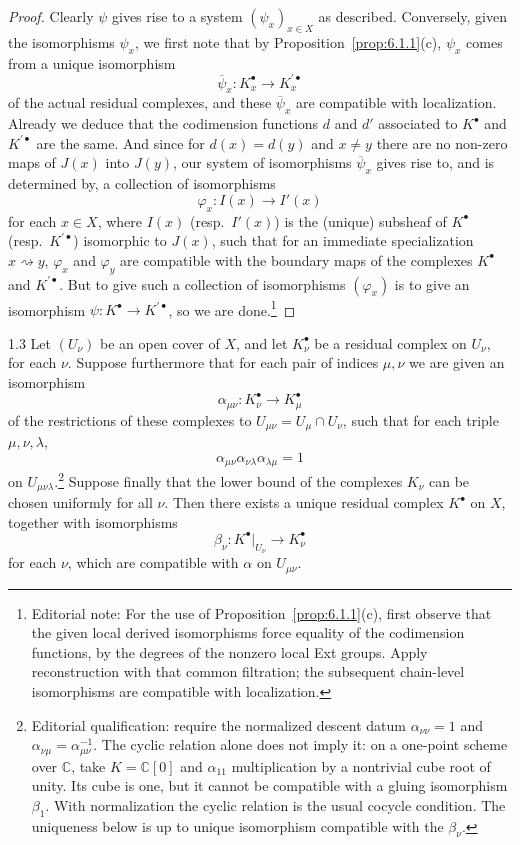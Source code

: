 \begin{proof}
Clearly $\psi$ gives rise to a system $(\psi_x)_{x\in X}$ as described. Conversely, given the isomorphisms $\psi_x$, we first note that by Proposition~\ref{prop:6.1.1}(c), $\psi_x$ comes from a unique isomorphism
\[
\overline{\psi}_x\colon K_x^\bullet\longrightarrow K_x^{\prime\bullet}
\]
of the actual residual complexes, and these $\overline{\psi}_x$ are compatible with localization. Already we deduce that the codimension functions $d$ and $d'$ associated to $K^\bullet$ and $K^{\prime\bullet}$ are the same. And since for $d(x)=d(y)$ and $x\neq y$ there are no non-zero maps of $J(x)$ into $J(y)$, our system of isomorphisms $\overline{\psi}_x$ gives rise to, and is determined by, a collection of isomorphisms
\[
\varphi_x\colon I(x)\longrightarrow I'(x)
\]
for each $x\in X$, where $I(x)$ (resp.\ $I'(x)$) is the (unique) subsheaf of $K^\bullet$ (resp.\ $K^{\prime\bullet}$) isomorphic to $J(x)$, such that for an immediate specialization $x\rightsquigarrow y$, $\varphi_x$ and $\varphi_y$ are compatible with the boundary maps of the complexes $K^\bullet$ and $K^{\prime\bullet}$. But to give such a collection of isomorphisms $(\varphi_x)$ is to give an isomorphism $\psi\colon K^\bullet\to K^{\prime\bullet}$, so we are done.\footnote{Editorial note: For the use of Proposition~\ref{prop:6.1.1}(c), first observe that the given local derived isomorphisms force equality of the codimension functions, by the degrees of the nonzero local Ext groups. Apply reconstruction with that common filtration; the subsequent chain-level isomorphisms are compatible with localization.}
\end{proof}

\begin{booklemma}{1.3}\label{lem:6.1.3}
Let $(U_\nu)$ be an open cover of $X$, and let $K_\nu^\bullet$ be a residual complex on $U_\nu$, for each $\nu$. Suppose furthermore that for each pair of indices $\mu,\nu$ we are given an isomorphism
\[
\alpha_{\mu\nu}\colon K_{\nu}^{\bullet}\longrightarrow K_{\mu}^{\bullet}
\]
of the restrictions of these complexes to $U_{\mu\nu}=U_{\mu}\cap U_{\nu}$, such that for each triple $\mu,\nu,\lambda$,
\[
\alpha_{\mu\nu}\alpha_{\nu\lambda}\alpha_{\lambda\mu}=1
\]
on $U_{\mu\nu\lambda}$.\footnote{Editorial qualification: require the normalized descent datum $\alpha_{\nu\nu}=1$ and $\alpha_{\nu\mu}=\alpha_{\mu\nu}^{-1}$. The cyclic relation alone does not imply it: on a one-point scheme over $\mathbb C$, take $K=\mathbb C[0]$ and $\alpha_{11}$ multiplication by a nontrivial cube root of unity. Its cube is one, but it cannot be compatible with a gluing isomorphism $\beta_1$. With normalization the cyclic relation is the usual cocycle condition. The uniqueness below is up to unique isomorphism compatible with the $\beta_\nu$.} Suppose finally that the lower bound of the complexes $K_{\nu}$ can be chosen uniformly for all $\nu$. Then there exists a unique residual complex $K^{\bullet}$ on $X$, together with isomorphisms
\[
\beta_{\nu}\colon K^{\bullet}|_{U_{\nu}}\longrightarrow K_{\nu}^{\bullet}
\]
for each $\nu$, which are compatible with $\alpha$ on $U_{\mu\nu}$.
\end{booklemma}

